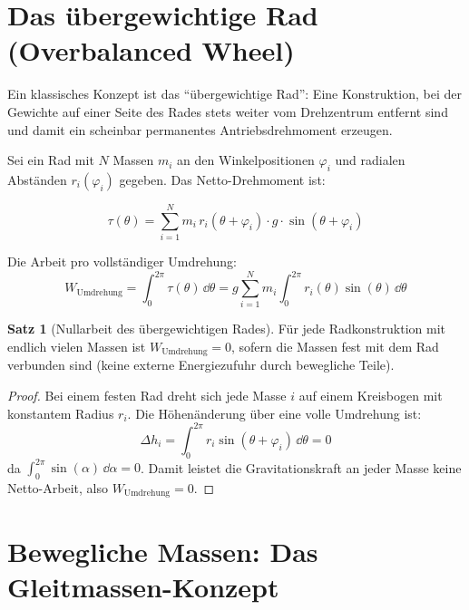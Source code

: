 ﻿\documentclass[12pt, a4paper]{report}
\theoremstyle{definition}
\newtheorem{theorem}{Satz}[section]
\theoremstyle{remark}
\begin{document}
\section{Das übergewichtige Rad (Overbalanced Wheel)}

Ein klassisches Konzept ist das ``übergewichtige Rad'': Eine Konstruktion, bei der
Gewichte auf einer Seite des Rades stets weiter vom Drehzentrum entfernt sind und
damit ein scheinbar permanentes Antriebsdrehmoment erzeugen.

Sei ein Rad mit $N$ Massen $m_i$ an den Winkelpositionen $\varphi_i$ und radialen
Abständen $r_i(\varphi_i)$ gegeben. Das Netto-Drehmoment ist:

\begin{equation}
  \tau(\theta) = \sum_{i=1}^{N} m_i \, r_i(\theta + \varphi_i) \cdot g \cdot \sin(\theta + \varphi_i)
  \label{eq:drehmoment_rad}
\end{equation}

Die Arbeit pro vollständiger Umdrehung:
\begin{equation}
  W_{\text{Umdrehung}} = \int_0^{2\pi} \tau(\theta) \, \dd\theta
  = g \sum_{i=1}^N m_i \int_0^{2\pi} r_i(\theta)\sin(\theta) \, \dd\theta
  \label{eq:arbeit_umdrehung}
\end{equation}

\begin{theorem}[Nullarbeit des übergewichtigen Rades]
  \label{thm:rad_null}
  Für jede Radkonstruktion mit endlich vielen Massen ist
  $W_{\text{Umdrehung}} = 0$, sofern die Massen fest mit dem Rad verbunden
  sind (keine externe Energiezufuhr durch bewegliche Teile).
\end{theorem}

\begin{proof}
  Bei einem festen Rad dreht sich jede Masse $i$ auf einem Kreisbogen mit
  konstantem Radius $r_i$. Die Höhenänderung über eine volle Umdrehung ist:
  \begin{equation}
    \Delta h_i = \int_0^{2\pi} r_i \sin(\theta + \varphi_i) \, \dd\theta = 0
  \end{equation}
  da $\int_0^{2\pi} \sin(\alpha) \, \dd\alpha = 0$. Damit leistet die Gravitationskraft
  an jeder Masse keine Netto-Arbeit, also $W_{\text{Umdrehung}} = 0$.
\end{proof}

\section{Bewegliche Massen: Das Gleitmassen-Konzept}
\end{document}
